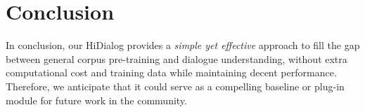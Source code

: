 \section{Conclusion}
In conclusion, our HiDialog provides a \emph{simple yet effective} approach to fill the gap between general corpus pre-training and dialogue understanding, without extra computational cost and training data while maintaining decent performance. Therefore, we anticipate that it could serve as a compelling baseline or plug-in module for future work in the community. 